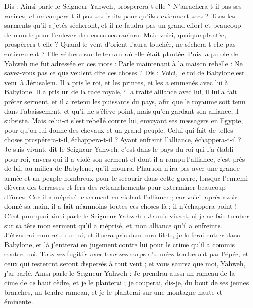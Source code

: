 \begin{multicols}{2}
Dis : Ainsi parle le Seigneur Yahweh, prospèrera-t-elle ? N’arrachera-t-il pas ses racines, et ne coupera-t-il pas ses fruits pour qu’ils deviennent secs ? Tous les sarments qu'il a jetés sécheront, et il ne faudra pas un grand effort et beaucoup de monde pour l'enlever de dessus ses racines.
Mais voici, quoique plantée, prospèrera-t-elle ? Quand le vent d'orient l'aura touchée, ne séchera-t-elle pas entièrement ? Elle séchera sur le terrain où elle était plantée.
Puis la parole de Yahweh me fut adressée en ces mots :
Parle maintenant à la maison rebelle : Ne savez-vous pas ce que veulent dire ces choses ? Dis : Voici, le roi de Babylone est venu à Jérusalem. Il a pris le roi, et les princes, et les a emmenés avec lui à Babylone.
Il a pris un de la race royale, il a traité alliance avec lui, il lui a fait prêter serment, et il a retenu les puissants du pays,
afin que le royaume soit tenu dans l’abaissement, et qu'il ne s'élève point, mais qu'en gardant son alliance, il subsiste.
Mais celui-ci s'est rebellé contre lui, envoyant ses messagers en Egypte, pour qu’on lui donne des chevaux et un grand peuple. Celui qui fait de telles choses prospérera-t-il, échappera-t-il ? Ayant enfreint l'alliance, échappera-t-il ?
Je suis vivant, dit le Seigneur Yahweh, c’est dans le pays du roi qui l'a établi pour roi, envers qui il a violé son serment et dont il a rompu l'alliance, c’est près de lui, au milieu de Babylone, qu’il mourra\FTNT{}.
Pharaon n’ira pas avec une grande armée et un peuple nombreux pour le secourir dans cette guerre, lorsque l'ennemi élèvera des terrasses et fera des retranchements pour exterminer beaucoup d’âmes.
Car il a méprisé le serment en violant l'alliance ; car voici, après avoir donné sa main, il a fait néanmoins toutes ces choses-là ; il n'échappera point !
C'est pourquoi ainsi parle le Seigneur Yahweh : Je suis vivant, si je ne fais tomber sur sa tête mon serment qu'il a méprisé, et mon alliance qu'il a enfreinte.
J'étendrai mon rets sur lui, et il sera pris dans mes filets, je le ferai entrer dans Babylone, et là j'entrerai en jugement contre lui pour le crime qu'il a commis contre moi.
Tous ses fugitifs avec tous ses corps d’armées tomberont par l'épée, et ceux qui resteront seront dispersés à tout vent ; et vous saurez que moi, Yahweh, j'ai parlé.
Ainsi parle le Seigneur Yahweh : Je prendrai aussi un rameau de la cime de ce haut cèdre, et je le planterai ; je couperai, dis-je, du bout de ses jeunes branches, un tendre rameau, et je le planterai sur une montagne haute et éminente.

\end{multicols}
